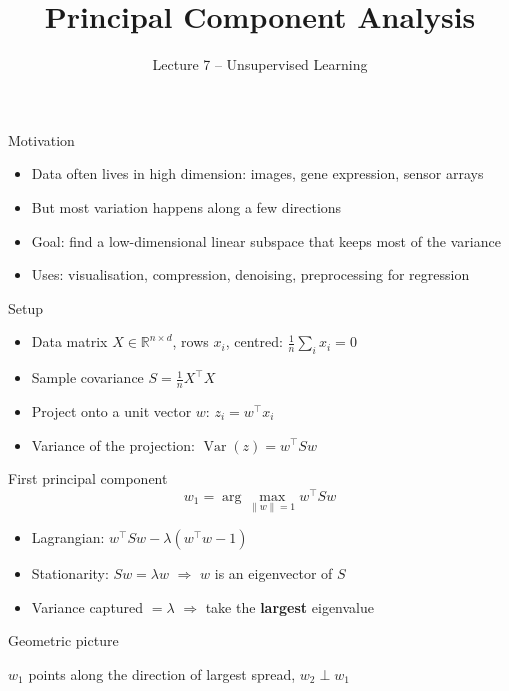 \documentclass[aspectratio=169]{beamer}
\title{Principal Component Analysis}
\subtitle{Lecture 7 -- Unsupervised Learning}
\date{}
\begin{document}
\frame{\titlepage}

\begin{frame}{Motivation}
\begin{itemize}
  \item Data often lives in high dimension: images, gene expression, sensor arrays
  \item But most variation happens along a few directions
  \item Goal: find a low-dimensional linear subspace that keeps most of the variance
  \item Uses: visualisation, compression, denoising, preprocessing for regression
\end{itemize}
\end{frame}

\begin{frame}{Setup}
\begin{itemize}
  \item Data matrix $X \in \mathbb{R}^{n \times d}$, rows $x_i$, centred: $\frac1n\sum_i x_i = 0$
  \item Sample covariance $S = \frac{1}{n} X^\top X$
  \item Project onto a unit vector $w$: $z_i = w^\top x_i$
  \item Variance of the projection: $\operatorname{Var}(z) = w^\top S w$
\end{itemize}
\end{frame}

\begin{frame}{First principal component}
\[
  w_1 = \arg\max_{\|w\|=1} w^\top S w
\]
\begin{itemize}
  \item Lagrangian: $w^\top S w - \lambda (w^\top w - 1)$
  \item Stationarity: $S w = \lambda w$ \quad $\Rightarrow$ $w$ is an eigenvector of $S$
  \item Variance captured $= \lambda$ \quad $\Rightarrow$ take the \textbf{largest} eigenvalue
\end{itemize}
\end{frame}

\begin{frame}{Geometric picture}
\centering
{}

\small $w_1$ points along the direction of largest spread, $w_2 \perp w_1$
\end{frame}
\end{document}
